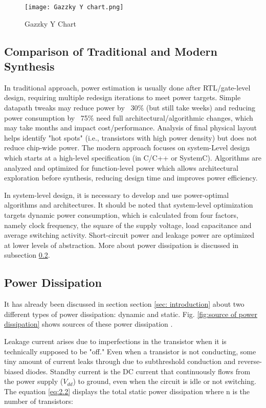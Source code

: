 \documentclass[conference]{IEEEtran}
\begin{document}
\begin{figure}[h!]
    \centering
    \texttt{[image: Gazzky Y chart.png]}
    \caption{Gazzky Y Chart \cite{Ret}}
    \label{fig:gazzky}
\end{figure}

\subsection{Comparison of Traditional and Modern Synthesis}
\label{subsec: comparison of traditional and modern synthesis}
In traditional approach, power estimation is usually done after RTL/gate-level design, requiring multiple redesign iterations to meet power targets. Simple datapath tweaks may reduce power by ~30\% (but still take weeks) and reducing power consumption by ~75\% need full architectural/algorithmic changes, which may take months and impact cost/performance. Analysis of final physical layout helps identify "hot spots" (i.e., transistors with high power density) but does not reduce chip-wide power. The modern approach focuses on system-Level design which starts at a high-level specification (in C/C++ or SystemC). Algorithms are analyzed and optimized for function-level power which allows architectural exploration before synthesis, reducing design time and improves power efficiency.

In system-level design, it is necessary to develop and use power-optimal algorithms and architectures. It should be noted that system-level optimization targets dynamic power consumption, which is calculated from four factors, namely clock frequency, the square of the supply voltage, load capacitance and average switching activity. Short-circuit power and leakage power are optimized at lower levels of abstraction. More about power dissipation is discussed in subsection \ref{subsec: power}.

\subsection{Power Dissipation}
\label{subsec: power}
It has already been discussed in section section \ref{sec: introduction} about two different types of power dissipation: dynamic and static. Fig. \ref{fig:source of power dissipation} shows 
sources of these power dissipation \cite{Saraju01}. 

Leakage current arises due to imperfections in the transistor when it is technically supposed to be "off." Even when a transistor is not conducting, some tiny amount of current leaks through due to subthreshold conduction and reverse-biased diodes. Standby current is the DC current that continuously flows from the power supply ($V_{dd}$) to ground, even when the circuit is idle or not switching. The equation \ref{eq:2.2} displays the total static power dissipation where n is the number of transistors:
\end{document}
